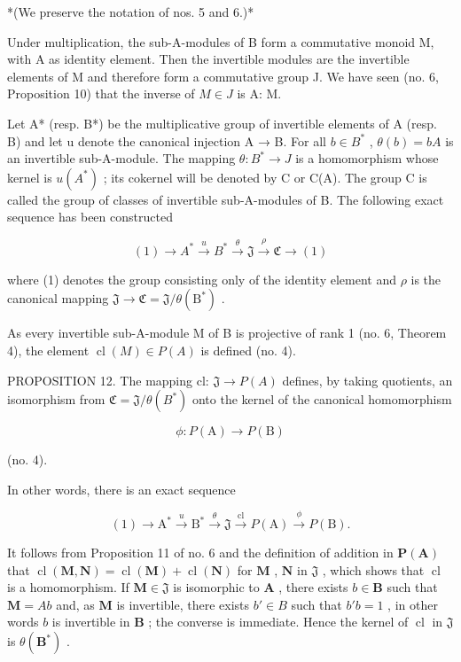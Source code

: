 *(We preserve the notation of nos. 5 and 6.)*

Under multiplication, the sub-A-modules of B form a commutative monoid M, with A as identity element. Then the invertible modules are the invertible elements of M and therefore form a commutative group J. We have seen (no. 6, Proposition 10) that the inverse of \(M \in J\) is A: M.

Let A* (resp. B*) be the multiplicative group of invertible elements of A (resp. B) and let u denote the canonical injection A → B. For all \(b \in B^{*}\) , \(\theta(b) = bA\) is an invertible sub-A-module. The mapping \(\theta: B^{*} \to J\) is a homomorphism whose kernel is \(u(A^{*})\) ; its cokernel will be denoted by C or C(A). The group C is called the group of classes of invertible sub-A-modules of B. The following exact sequence has been constructed

\[
(1) \longrightarrow A ^ {*} \stackrel {u} {\longrightarrow} B ^ {*} \stackrel {\theta} {\longrightarrow} \mathfrak {J} \stackrel {\rho} {\longrightarrow} \mathfrak {C} \longrightarrow (1)\tag{10}
\]

where (1) denotes the group consisting only of the identity element and \(\rho\) is the canonical mapping \(\mathfrak{J} \to \mathfrak{C} = \mathfrak{J}/\theta(\mathrm{B}^*)\) .

As every invertible sub-A-module M of B is projective of rank 1 (no. 6, Theorem 4), the element \(\operatorname{cl}(M) \in P(A)\) is defined (no. 4).

PROPOSITION 12. The mapping cl: \(\mathfrak{J} \to P(A)\) defines, by taking quotients, an isomorphism from \(\mathfrak{C} = \mathfrak{J}/\theta(B^{*})\) onto the kernel of the canonical homomorphism

\[
\phi \colon P (\mathrm{A}) \to P (\mathrm{B})
\]

(no. 4).

In other words, there is an exact sequence

\[
(1) \longrightarrow \mathrm{A} ^ {*} \stackrel {u} {\longrightarrow} \mathrm{B} ^ {*} \stackrel {\theta} {\longrightarrow} \mathfrak {J} \stackrel {\mathrm{cl}} {\longrightarrow} P (\mathrm{A}) \stackrel {\phi} {\longrightarrow} P (\mathrm{B}).\tag{11}
\]

It follows from Proposition 11 of no. 6 and the definition of addition in \(\mathbf{P}(\mathbf{A})\) that \(\operatorname{cl}(\mathbf{M},\mathbf{N}) = \operatorname{cl}(\mathbf{M}) + \operatorname{cl}(\mathbf{N})\) for \(\mathbf{M}\) , \(\mathbf{N}\) in \(\mathfrak{J}\) , which shows that \(\operatorname{cl}\) is a homomorphism. If \(\mathbf{M} \in \mathfrak{J}\) is isomorphic to \(\mathbf{A}\) , there exists \(b \in \mathbf{B}\) such that \(\mathbf{M} = Ab\) and, as \(\mathbf{M}\) is invertible, there exists \(b' \in B\) such that \(b'b = 1\) , in other words \(b\) is invertible in \(\mathbf{B}\) ; the converse is immediate. Hence the kernel of \(\operatorname{cl}\) in \(\mathfrak{J}\) is \(\theta(\mathbf{B}^*)\) .


